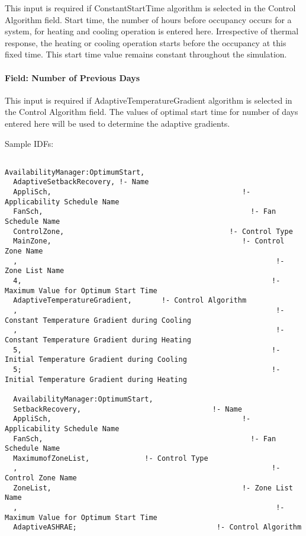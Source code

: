 This input is required if ConstantStartTime algorithm is selected in the Control Algorithm field. Start time, the number of hours before occupancy occurs for a system, for heating and cooling operation is entered here. Irrespective of thermal response, the heating or cooling operation starts before the occupancy at this fixed time. This start time value remains constant throughout the simulation.

\paragraph{Field: Number of Previous Days}\label{field-number-of-previous-days}

This input is required if AdaptiveTemperatureGradient algorithm is selected in the Control Algorithm field. The values of optimal start time for number of days entered here will be used to determine the adaptive gradients.

Sample IDFs:

\begin{lstlisting}

AvailabilityManager:OptimumStart,
  AdaptiveSetbackRecovery, !- Name
  AppliSch,                                             !- Applicability Schedule Name
  FanSch,                                                 !- Fan Schedule Name
  ControlZone,                                       !- Control Type
  MainZone,                                             !- Control Zone Name
  ,                                                             !- Zone List Name
  4,                                                           !- Maximum Value for Optimum Start Time
  AdaptiveTemperatureGradient,       !- Control Algorithm
  ,                                                             !- Constant Temperature Gradient during Cooling
  ,                                                             !- Constant Temperature Gradient during Heating
  5,                                                           !- Initial Temperature Gradient during Cooling
  5;                                                           !- Initial Temperature Gradient during Heating

  AvailabilityManager:OptimumStart,
  SetbackRecovery,                               !- Name
  AppliSch,                                             !- Applicability Schedule Name
  FanSch,                                                 !- Fan Schedule Name
  MaximumofZoneList,             !- Control Type
  ,                                                            !- Control Zone Name
  ZoneList,                                             !- Zone List Name
  ,                                                             !- Maximum Value for Optimum Start Time
  AdaptiveASHRAE;                                 !- Control Algorithm
\end{lstlisting}

